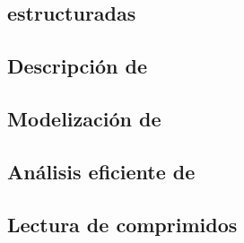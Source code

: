 



\subsection{\Transacciones estructuradas}
\label{sec:clasificacion:transacciones-tipo-ii:transacciones-estructuradas}




\subsection{Descripción de \mushroom}
\label{sec:clasificacion:transacciones-tipo-ii:descripcion-de-mushroom}




\subsection{Modelización de \Registros}
\label{sec:clasificacion:transacciones-tipo-ii:modelizacion}




\subsection{Análisis eficiente de \Registros}
\label{sec:clasificacion:transacciones-tipo-ii:analisis-eficiente}




\subsection{Lectura de \datasets comprimidos}
\label{sec:clasificacion:transacciones-tipo-ii:lectura}

